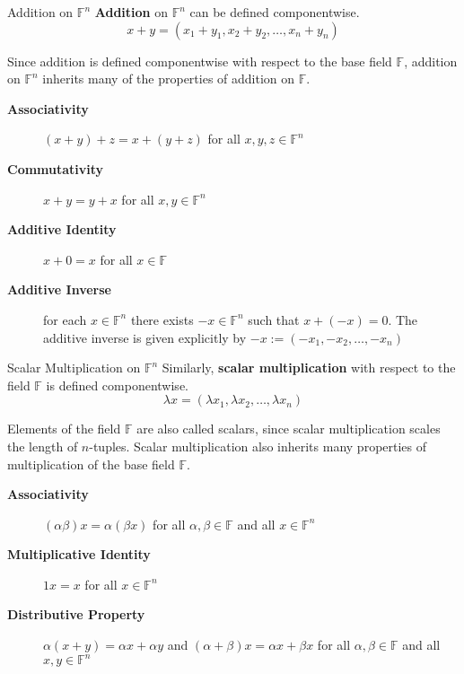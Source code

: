 \documentclass{book}
\newcommand{\field}{\mathbb{F}}
\theoremstyle{definition}
\begin{document}
\begin{definition}{Addition on $\field^n$}
    \noindent \textbf{Addition} on $\field^n$ can be defined componentwise.
    \[
        x+y = (x_1+y_1,x_2+y_2,\dots,x_n+y_n)
    \]
\end{definition}

\noindent Since addition is defined componentwise with respect to the base field
$\field$, addition on $\field^n$ inherits many of the properties of addition on
$\field$.

\begin{description}
    \item[ \textbf{Associativity}] $(x+y)+z = x+(y+z)$ for all $x,y,z\in\field^n$ 
    \item[ \textbf{Commutativity}] $x+y = y+x$ for all $x,y\in\field^n$ 
    \item[ \textbf{Additive Identity}] $x+0 = x$ for all $x\in\field$ 
    \item[ \textbf{Additive Inverse}] for each $x\in\field^n$ there exists
        $-x\in\field^n$ such that $x+(-x)=0$. The additive inverse is given
        explicitly by $-x := (-x_1,-x_2,\dots,-x_n)$ 
\end{description}

\begin{definition}{Scalar Multiplication on $\field^n$}
    Similarly, \textbf{scalar multiplication} with respect to the field $\field$
    is defined componentwise.
    \[
        \lambda x = (\lambda x_1,\lambda x_2,\dots,\lambda x_n)
    \]
\end{definition}

\noindent Elements of the field $\field$ are also called scalars, since
scalar multiplication scales the length of $n$-tuples. Scalar multiplication also
inherits many properties of multiplication of the base field $\field$.

\begin{description}
    \item[ \textbf{Associativity}] $(\alpha\beta)x = \alpha(\beta x)$ for all
        $\alpha,\beta\in\field$ and all $x\in\field^n$
    \item[ \textbf{Multiplicative Identity}] $1x = x$ for all $x\in\field^n$ 
    \item[ \textbf{Distributive Property}] $\alpha(x+y) = \alpha x +\alpha y$ and
        $(\alpha+\beta)x = \alpha x + \beta x$ for all $\alpha,\beta\in\field$
        and all $x,y\in\field^n$  
\end{description}
\break
\end{document}
